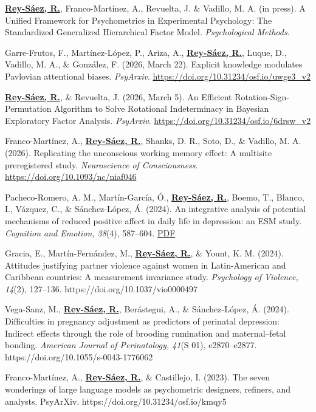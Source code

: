 \documentclass[
  letterpaper,
  DIV=11,
  numbers=noendperiod]{scrartcl}
\begin{document}
\ul{\textbf{Rey-Sáez, R.}}, Franco-Martínez, A., Revuelta, J. \&
Vadillo, M. A. (in press). A Unified Framework for Psychometrics in
Experimental Psychology: The Standardized Generalized Hierarchical
Factor Model. \emph{Psychological Methods}.

Garre-Frutos, F., Martínez-López, P., Ariza, A., \ul{\textbf{Rey-Sáez,
R.}}, Luque, D., Vadillo, M. A., \& González, F. (2026, March 22).
Explicit knowledge modulates Pavlovian attentional biases.
\emph{PsyArxiv}. \url{https://doi.org/10.31234/osf.io/uwge3_v2}

\ul{\textbf{Rey-Sáez, R.}}, \& Revuelta, J. (2026, March 5). An
Efficient Rotation-Sign-Permutation Algorithm to Solve Rotational
Indeterminacy in Bayesian Exploratory Factor Analysis. \emph{PsyArxiv}.
\url{https://doi.org/10.31234/osf.io/6drsw_v2}

Franco-Martínez, A., \ul{\textbf{Rey-Sáez, R.}}, Shanks, D. R., Soto,
D., \& Vadillo, M. A. (2026). Replicating the unconscious working memory
effect: A multisite preregistered study. \emph{Neuroscience of
Consciousness}. \url{https://doi.org/10.1093/nc/niaf046}

Pacheco-Romero, A. M., Martín-García, Ó., \ul{\textbf{Rey-Sáez, R.}},
Boemo, T., Blanco, I., Vázquez, C., \& Sánchez-López, Á. (2024). An
integrative analysis of potential mechanisms of reduced positive affect
in daily life in depression: an ESM study. \emph{Cognition and Emotion,
38}(4), 587--604.
\href{https://www.tandfonline.com/doi/epdf/10.1080/02699931.2024.2314066?needAccess=true}{PDF}

Gracia, E., Martín-Fernández, M., \ul{\textbf{Rey-Sáez, R.}}, \& Yount,
K. M. (2024). Attitudes justifying partner violence against women in
Latin-American and Caribbean countries: A measurement invariance study.
\emph{Psychology of Violence, 14}(2), 127--136.
https://doi.org/10.1037/vio0000497

Vega-Sanz, M., \ul{\textbf{Rey-Sáez, R.}}, Berástegui, A., \&
Sánchez-López, Á. (2024). Difficulties in pregnancy adjustment as
predictors of perinatal depression: Indirect effects through the role of
brooding rumination and maternal--fetal bonding. \emph{American Journal
of Perinatology, 41}(S 01), e2870--e2877.
https://doi.org/10.1055/s-0043-1776062

Franco-Martínez, A., \ul{\textbf{Rey-Sáez, R.}}, \& Castillejo, I.
(2023). The seven wonderings of large language models as psychometric
designers, refiners, and analysts. PsyArXiv.
https://doi.org/10.31234/osf.io/kmqy5
\end{document}
